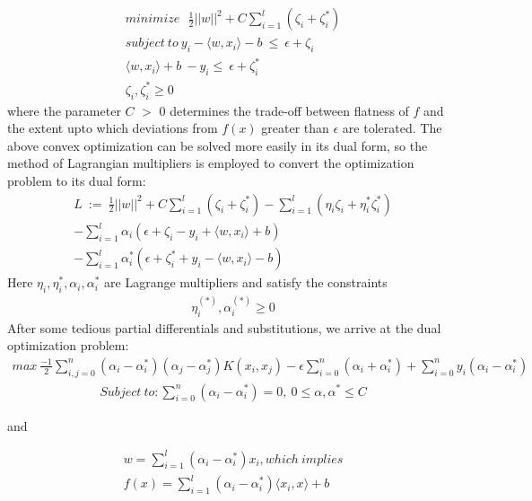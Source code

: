 \documentclass[12pt]{article}
\begin{document}
 \begin{align*} 
minimize\ \ \ \frac{1}{2}||w||^2 + C\sum_{i=1}^{l}{(\zeta_{i} + {\zeta^*_{i}})}\\
subject\ to\ y_{i} - \langle w, x_{i}\rangle - b\ \leq\ \epsilon +\zeta_{i}\\ 
\langle w, x_{i}\rangle + b\ - y_{i} \leq\ \epsilon +\zeta^*_{i}\\
\zeta_{i},\zeta^*_{i}\geq 0
 \end{align*}
 where the parameter $C$ $>$ 0 determines the trade-off between flatness of $f$ and the extent upto which deviations from $f(x)$ greater than $\epsilon$ are tolerated.
 \newline\newline
 The above convex optimization can be solved more easily in its dual form, so the method of Lagrangian multipliers is employed to convert the optimization problem to its dual form:
\belowdisplayskip=5pt
  \begin{align*} 
  L\ :=\ \frac{1}{2}||w||^2 + C\sum_{i=1}^{l}{(\zeta_{i} + {\zeta^*_{i}})}-\sum_{i=1}^{l}{(\eta_{i}\zeta_{i} + \eta^*_{i}\zeta^*_{i})}\\
  -\sum_{i=1}^{l}{\alpha_{i}(\epsilon + \zeta_{i} - y_{i}+\langle w, x_{i}\rangle + b)}\\
  -\sum_{i=1}^{l}{\alpha^*_{i}(\epsilon + \zeta^*_{i} + y_{i}-\langle w, x_{i}\rangle - b)}
 \end{align*}
 Here $\eta_{i}, \eta^*_{i}, \alpha_{i}, \alpha^*_{i}$ are Lagrange multipliers and satisfy the constraints  
 \begin{align*} 
 \eta^{(*)}_{i}, \alpha^{(*)}_{i} \geq 0
 \end{align*}
 After some tedious partial differentials and substitutions, we arrive at the dual optimization problem:
 \begin{align*}
  max\ \frac{-1}{2}\sum_{i, j=0}^{n}{(\alpha_{i} - \alpha_{i}^*)(\alpha_{j} - \alpha_{j}^*)K(x_{i}, x_{j})} - \epsilon\sum_{i=0}^{n}{(\alpha_{i} + \alpha_{i}^*)}+\sum_{i=0}^{n}{y_{i}(\alpha_{i} - \alpha_{i}^*)}   
 \end{align*}
 \begin{gather*}
 Subject \ to: \sum_{i=0}^{n}{(\alpha_{i} - \alpha_{i}^*)} = 0, \ 0\leq\alpha, \alpha^*\leq C
 \end{gather*}
 \centerline{and} 
 \begin{align}
w = \sum_{i=1}^{l}{(\alpha_{i} - \alpha^*_{i})x_{i}}, which\ implies\\
  f(x) = \sum_{i=1}^{l}{(\alpha_{i} - \alpha^*_{i}) \langle x_{i}, x \rangle} + b
 \end{align}
\end{document}
